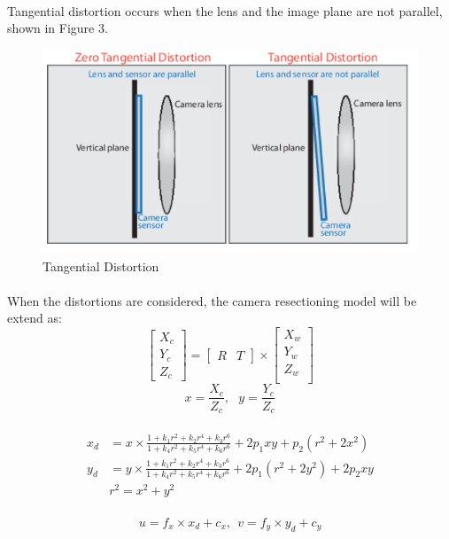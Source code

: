 \documentclass{article}
\begin{document}
\paragraph{}Tangential distortion occurs when the lens and the image plane are not parallel, shown in Figure 3.
\begin{figure}[H]
\centering
\includegraphics[scale=0.5]{3.png}
\caption{Tangential Distortion}
\label{fig:label}
\end{figure}
\paragraph{}When the distortions are considered, the camera resectioning model will be extend as:
\begin{equation}
\left[\begin{array}{c}
X_c\\
Y_c\\
Z_c
\end{array}
\right] =  \left[\begin{array}{cc}
R & T
\end{array}
\right] \times \left[\begin{array}{c}
X_w\\
Y_w\\
Z_w\\
\end{array}
\right]
\end{equation}
\begin{equation}
x = \frac{X_c}{Z_c},\ \ \ y = \frac{Y_c}{Z_c}
\end{equation}
\\
\begin{equation}
\begin{align}
x_d &= x \times \frac{1+k_1r^2+k_2r^4+k_3r^6}{1+k_4r^2+k_5r^4+k_6r^6} + 2p_1xy + p_2(r^2 + 2x^2)\\
y_d &= y \times \frac{1+k_1r^2+k_2r^4+k_3r^6}{1+k_4r^2+k_5r^4+k_6r^6} + 2p_1(r^2 + 2y^2) + 2p_2xy \\
&r^2 = x^2 + y^2
\end{align}
\end{equation}
\\
\begin{equation}
u = f_x \times x_d + c_x,\ \ v = f_y \times y_d + c_y
\end{equation}
\end{document}
